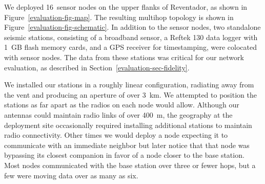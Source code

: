 We deployed 16~sensor nodes on the upper flanks of Reventador, as shown in
Figure~\ref{evaluation-fig-map}. The resulting multihop topology is shown in
Figure~\ref{evaluation-fig-schematic}. In addition to the sensor nodes, two
standalone seismic stations, consisting of a broadband sensor, a Reftek 130
data logger with 1~GB flash memory cards, and a GPS receiver for
timestamping, were colocated with sensor nodes. The data from these stations
was critical for our network evaluation, as described in
Section~\ref{evaluation-sec-fidelity}.

\vfill\eject

We installed our stations in a roughly linear configuration, radiating away
from the vent and producing an aperture of over 3~km. We attempted to
position the stations as far apart as the radios on each node would allow.
Although our antennas could maintain radio links of over 400~m, the geography
at the deployment site occasionally required installing additional stations
to maintain radio connectivity. Other times we would deploy a node expecting
it to communicate with an immediate neighbor but later notice that that node
was bypassing its closest companion in favor of a node closer to the base
station. Most nodes communicated with the base station over three or fewer
hops, but a few were moving data over as many as six.
